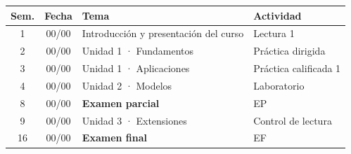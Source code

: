 \documentclass{academic-report}
\begin{document}
\encabezado

\begin{table}[h]\centering
\begin{tabularx}{\linewidth}{c c X l}
\toprule
\textbf{Sem.} & \textbf{Fecha} & \textbf{Tema} & \textbf{Actividad} \\\midrule
1  & 00/00 & Introducción y presentación del curso        & Lectura 1 \\
2  & 00/00 & Unidad 1 · Fundamentos                        & Práctica dirigida \\
3  & 00/00 & Unidad 1 · Aplicaciones                       & Práctica calificada 1 \\
4  & 00/00 & Unidad 2 · Modelos                            & Laboratorio \\
\midrule
8  & 00/00 & \textbf{Examen parcial}                       & EP \\
\midrule
9  & 00/00 & Unidad 3 · Extensiones                        & Control de lectura \\
16 & 00/00 & \textbf{Examen final}                         & EF \\
\bottomrule
\end{tabularx}
\end{table}
\end{document}
